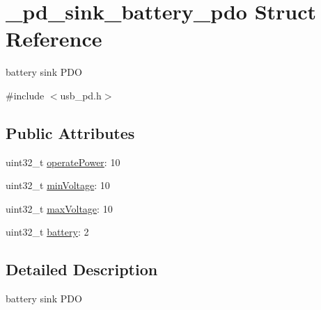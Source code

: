 \hypertarget{struct__pd__sink__battery__pdo}{\section{\-\_\-pd\-\_\-sink\-\_\-battery\-\_\-pdo Struct Reference}
\label{struct__pd__sink__battery__pdo}
}


battery sink P\-D\-O  




{\ttfamily \#include $<$usb\-\_\-pd.\-h$>$}

\subsection*{Public Attributes}
\begin{DoxyCompactItemize}
\item 
uint32\-\_\-t \hyperlink{struct__pd__sink__battery__pdo_aede06aa3716908a68c90828fbfe5cebe}{operate\-Power}\-: 10
\item 
uint32\-\_\-t \hyperlink{struct__pd__sink__battery__pdo_a473824d26b81e000486844b83e32b09d}{min\-Voltage}\-: 10
\item 
uint32\-\_\-t \hyperlink{struct__pd__sink__battery__pdo_a5fe153e249c105e6b8414233ae216710}{max\-Voltage}\-: 10
\item 
uint32\-\_\-t \hyperlink{struct__pd__sink__battery__pdo_a417d58609316fbebd02091b96ec83ed8}{battery}\-: 2
\end{DoxyCompactItemize}


\subsection{Detailed Description}
battery sink P\-D\-O 

